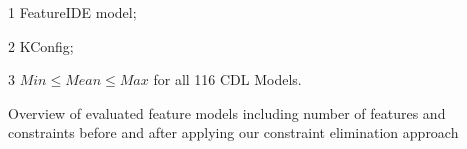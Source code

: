 \begin{table*}
{\begin{threeparttable}
			\begin{tablenotes} 
				\centering 
				\scriptsize 
				\item[1]FeatureIDE model; \item[2] KConfig; \item[3] $\mathit{Min} \leq \mathit{Mean} \leq \mathit{Max}$ for all 116 CDL Models. 
			\end{tablenotes} 
		\end{threeparttable} 
	} 
	\caption{Overview of evaluated feature models including number of features and constraints before and after applying our constraint elimination approach} 
\end{table*} 
